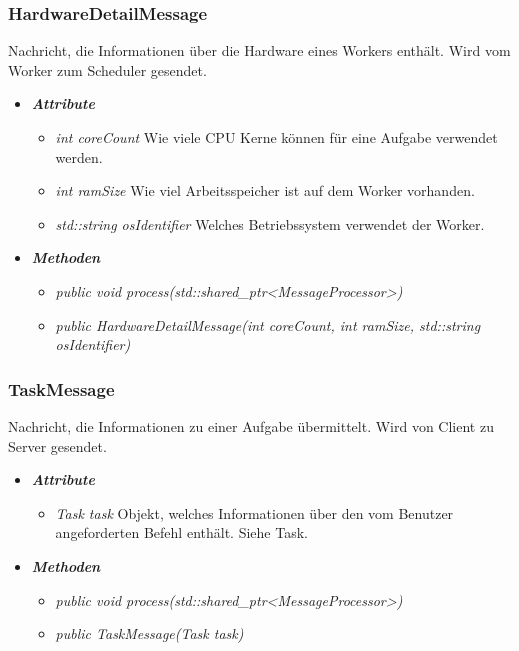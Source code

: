 \documentclass[a4paper,12pt]{article}
\begin{document}
\subsubsection{HardwareDetailMessage}

Nachricht, die Informationen über die Hardware eines Workers enthält. Wird vom Worker zum Scheduler gesendet.

	\begin{itemize}[label={}]

	\item\textit{\textbf{Attribute}}
		\begin{itemize}[label={\textbullet}]
			\item\textit{int coreCount} Wie viele CPU Kerne können für eine Aufgabe verwendet werden.
			\item\textit{int ramSize} Wie viel Arbeitsspeicher ist auf dem Worker vorhanden.
			\item\textit{std::string osIdentifier} Welches Betriebssystem verwendet der Worker.
			
		\end{itemize}

	\item\textit{\textbf{Methoden}}
		\begin{itemize}[label={\textbullet}]
			\item\textit{public void process(std::shared\_ptr<MessageProcessor>)}
			\item\textit{public HardwareDetailMessage(int coreCount, int ramSize, std::string osIdentifier)}

		\end{itemize}

\end{itemize}


\subsubsection{TaskMessage}

Nachricht, die Informationen zu einer Aufgabe übermittelt. Wird von Client zu Server gesendet.

	\begin{itemize}[label={}]

	\item\textit{\textbf{Attribute}}
		\begin{itemize}[label={\textbullet}]
			\item\textit{Task task} Objekt, welches Informationen über den vom Benutzer angeforderten Befehl enthält. Siehe Task.
			
		\end{itemize}

	\item\textit{\textbf{Methoden}}
		\begin{itemize}[label={\textbullet}]
			\item\textit{public void process(std::shared\_ptr<MessageProcessor>)}
			\item\textit{public TaskMessage(Task task)}

		\end{itemize}
\end{itemize}
\end{document}
